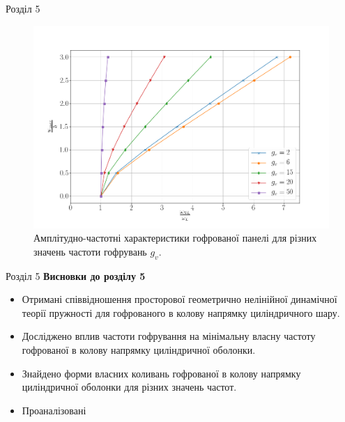 \documentclass[8pt]{beamer}
\numberwithin{figure}{section}
\numberwithin{equation}{section}
\numberwithin{table}{section}
\begin{document}
\begin{frame}{Розділ 5}

\begin{figure}
	\includegraphics[scale=0.3]{pic/corrugated_nonlinear.png}
		\caption{Амплітудно-частотні характеристики гофрованої панелі для різних значень частоти гофрувань $g_v$.}
		\label{fig:omage_K_h}
\end{figure}

\end{frame}

\begin{frame}{Розділ 5}
\textbf{Висновки до розділу 5}\\
\vspace{1em}
\begin{itemize}
\item Отримані співвідношення просторової геометрично нелінійної динамічної теорії пружності для гофрованого в колову напрямку циліндричного шару.
\item Досліджено вплив частоти гофрування на мінімальну власну частоту гофрованої в колову напрямку циліндричної оболонки.
\item Знайдено форми власних коливань гофрованої в колову напрямку циліндричної оболонки для різних значень частот.
\item Проаналізовані
\end{itemize}

\end{frame}
\end{document}
